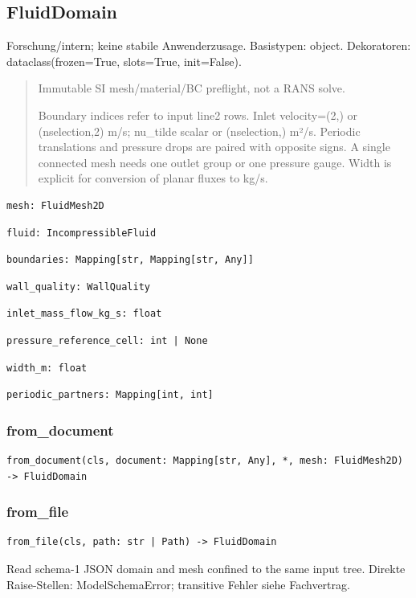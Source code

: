 \subsection{FluidDomain}
Forschung/intern; keine stabile Anwenderzusage.
Basistypen: object. Dekoratoren: dataclass(frozen=True, slots=True, init=False).
\begin{quote}
Immutable SI mesh/material/BC preflight, not a RANS solve.\par Boundary indices refer to input line2 rows. Inlet velocity=(2,) or (nselection,2) m/s; nu\_tilde scalar or (nselection,) m²/s. Periodic translations and pressure drops are paired with opposite signs. A single connected mesh needs one outlet group or one pressure gauge. Width is explicit for conversion of planar fluxes to kg/s.
\end{quote}
\begin{lstlisting}
mesh: FluidMesh2D
\end{lstlisting}
\begin{lstlisting}
fluid: IncompressibleFluid
\end{lstlisting}
\begin{lstlisting}
boundaries: Mapping[str, Mapping[str, Any]]
\end{lstlisting}
\begin{lstlisting}
wall_quality: WallQuality
\end{lstlisting}
\begin{lstlisting}
inlet_mass_flow_kg_s: float
\end{lstlisting}
\begin{lstlisting}
pressure_reference_cell: int | None
\end{lstlisting}
\begin{lstlisting}
width_m: float
\end{lstlisting}
\begin{lstlisting}
periodic_partners: Mapping[int, int]
\end{lstlisting}
\subsubsection*{from\_document}
\begin{lstlisting}
from_document(cls, document: Mapping[str, Any], *, mesh: FluidMesh2D) -> FluidDomain
\end{lstlisting}
\subsubsection*{from\_file}
\begin{lstlisting}
from_file(cls, path: str | Path) -> FluidDomain
\end{lstlisting}
Read schema-1 JSON domain and mesh confined to the same input tree.
Direkte Raise-Stellen: ModelSchemaError; transitive Fehler siehe Fachvertrag.
